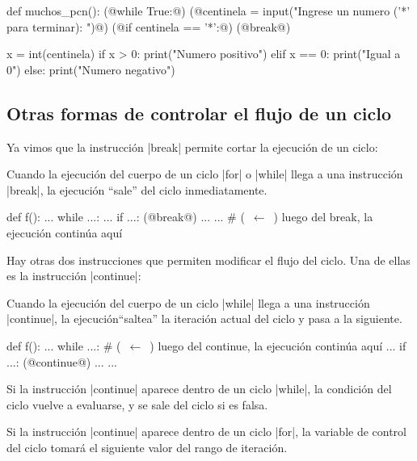 \begin{codigo-python-sn}
def muchos_pcn():
    (@while True:@)
        (@centinela = input("Ingrese un numero ('*' para terminar): ")@)
        (@if centinela == '*':@)
            (@break@)

        x = int(centinela)
        if x > 0:
            print("Numero positivo")
        elif x == 0:
            print("Igual a 0")
        else:
            print("Numero negativo")
\end{codigo-python-sn}

\subsection{Otras formas de controlar el flujo de un ciclo}

Ya vimos que la instrucción |break| permite cortar la ejecución de un ciclo:

\begin{observacion}
Cuando la ejecución del cuerpo de un ciclo |for| o |while| llega a una
instrucción |break|, la ejecución ``sale'' del ciclo inmediatamente.

\begin{codigo-python-sn}
def f():
    ...
    while ...:
        ...
        if ...:
            (@break@)
        ...
    ... # (~$\leftarrow$~) luego del break, la ejecución continúa aquí
\end{codigo-python-sn}
\end{observacion}

Hay otras dos instrucciones que permiten modificar el flujo del ciclo. Una de
ellas es la instrucción |continue|:

\begin{observacion}
Cuando la ejecución del cuerpo de un ciclo |while| llega a una
instrucción |continue|, la ejecución``saltea'' la iteración actual del ciclo y
pasa a la siguiente.

\begin{codigo-python-sn}
def f():
    ...
    while ...: # (~$\leftarrow$~) luego del continue, la ejecución continúa aquí
        ...
        if ...:
            (@continue@)
        ...
    ...
\end{codigo-python-sn}
\end{observacion}

Si la instrucción |continue| aparece dentro de un ciclo |while|, la condición
del ciclo vuelve a evaluarse, y se sale del ciclo si es falsa.

Si la instrucción |continue| aparece dentro de un ciclo |for|, la variable de
control del ciclo tomará el siguiente valor del rango de iteración.

